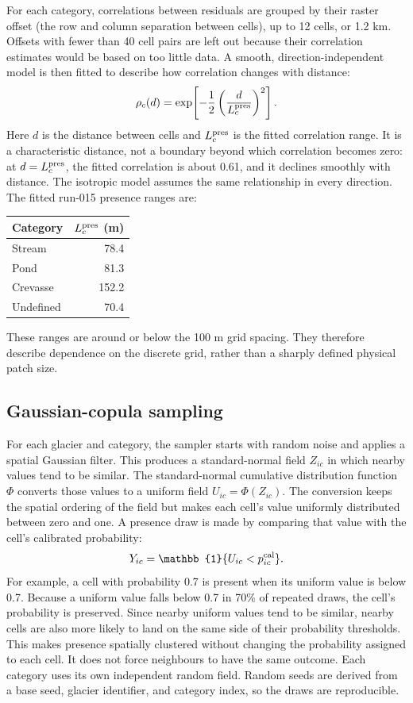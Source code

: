 \documentclass[11pt,a4paper]{article}
\begin{document}
For each category, correlations between residuals are grouped by their raster
offset (the row and column separation between cells), up to 12 cells, or
1.2 km. Offsets with fewer than 40 cell pairs are left out because their
correlation estimates would be based on too little data. A smooth,
direction-independent model is then fitted to describe how correlation changes
with distance:
\[
 \rho_c(d)=\exp\!\left[-\frac{1}{2}\left(\frac{d}{L_c^{\rm pres}}\right)^2\right].
\]
Here $d$ is the distance between cells and $L_c^{\rm pres}$ is the fitted
correlation range. It is a characteristic distance, not a boundary beyond
which correlation becomes zero: at $d=L_c^{\rm pres}$, the fitted correlation
is about 0.61, and it declines smoothly with distance. The isotropic model
assumes the same relationship in every direction.
The fitted run-015 presence ranges are:
\begin{center}
\begin{tabular}{lr}
\toprule
Category & $L_c^{\rm pres}$ (m)\\
\midrule
Stream & 78.4\\
Pond & 81.3\\
Crevasse & 152.2\\
Undefined & 70.4\\
\bottomrule
\end{tabular}
\end{center}
These ranges are around or below the 100 m grid spacing. They therefore
describe dependence on the discrete grid, rather than a sharply defined
physical patch size.

\subsection{Gaussian-copula sampling}
For each glacier and category, the sampler starts with random noise and applies
a spatial Gaussian filter. This produces a standard-normal field $Z_{ic}$ in
which nearby values tend to be similar. The standard-normal cumulative
distribution function $\Phi$ converts those values to a uniform field
$U_{ic}=\Phi(Z_{ic})$. The conversion keeps the spatial ordering of the field
but makes each cell's value uniformly distributed between zero and one. A
presence draw is made by comparing that value with the cell's calibrated
probability:
\[
 Y_{ic}=\mathbb{1}\{U_{ic}<p_{ic}^{\rm cal}\}.
\]
For example, a cell with probability 0.7 is present when its uniform value is
below 0.7. Because a uniform value falls below 0.7 in 70\% of repeated draws,
the cell's probability is preserved. Since nearby uniform values tend to be
similar, nearby cells are also more likely to land on the same side of their
probability thresholds. This makes presence spatially clustered without
changing the probability assigned to each cell. It does not force neighbours
to have the same outcome. Each category uses its own independent random field.
Random seeds are derived from a base seed, glacier identifier, and category
index, so the draws are reproducible.
\end{document}
